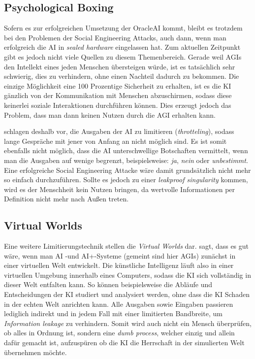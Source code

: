        \subsection{Psychological Boxing}

        Sofern es zur erfolgreichen Umsetzung der OracleAI kommt, bleibt es trotzdem bei den Problemen der Social
        Engineering Attacks, auch dann, wenn man erfolgreich die AI in \textit{sealed hardware} eingelassen hat.\cite[p. 4]{ebhardt2018threat}
        Zum aktuellen Zeitpunkt gibt es jedoch nicht viele Quellen zu diesem Themenbereich. Gerade weil AGIs den Intellekt
        eines jeden Menschen übersteigen würde, ist es tatsächlich sehr schwierig, dies zu verhindern, ohne einen Nachteil
        dadurch zu bekommen.\cite[p. 204]{yampolskiy2012leakproofing} Die einzige Möglichkeit eine 100 Prozentige Sicherheit
        zu erhalten, ist es die KI gänzlich von der Kommunikation mit Menschen abzuschirmen, sodass diese keinerlei
        soziale Interaktionen durchführen können. Dies erzeugt jedoch das Problem, dass man dann keinen Nutzen durch
        die AGI erhalten kann.

        \citealp{armstrongforthcoming} schlagen deshalb vor, die Ausgaben der AI zu limitieren (\textit{throtteling}), sodass
        lange Gespräche mit jener von Anfang an nicht möglich sind.\cite[p. 306]{armstrongforthcoming} Es ist somit
        ebenfalls nicht möglich, dass die AI unterschwellige Botschaften vermittelt, wenn man die Ausgaben auf wenige
        begrenzt, beispielsweise: \textit{ja}, \textit{nein} oder \textit{unbestimmt}. Eine erfolgreiche Social Engineering
        Attacke wäre damit grundsätzlich nicht mehr so einfach durchzuführen.\cite[p. 309]{armstrongforthcoming}
        Sollte es jedoch zu einer \textit{leakproof singularity} kommen, wird es der Menschheit kein Nutzen bringen, da
        wertvolle Informationen per Definition nicht mehr nach Außen treten.

        \subsection{Virtual Worlds}
        Eine weitere Limitierungstechnik stellen die \textit{Virtual Worlds} dar. \citep{chalmers2010singularity} sagt,
        dass es gut wäre, wenn man AI -und AI+-Systeme (gemeint sind hier AGIs) zunächst in einer virtuellen Welt
        entwickelt. \cite[p. 37]{chalmers2010singularity} Die künstliche Intelligenz läuft also in einer virtuellen Umgebung
        innerhalb eines Computers, sodass die KI sich vollständig in dieser Welt entfalten kann. So können beispielsweise
        die Abläufe und Entscheidungen der KI studiert und analysiert werden, ohne dass die KI Schaden in der echten Welt
        anrichten kann. Alle Ausgaben sowie Eingaben passieren lediglich indirekt und in jedem Fall mit einer limitierten
        Bandbreite, um \textit{Information leakage} zu verhindern. \cite[p. 310]{armstrongforthcoming} Somit wird auch
        nicht ein Mensch überprüfen, ob alles in Ordnung ist, sondern eine \textit{dumb process}, welcher einzig und allein
        dafür gemacht ist, aufzuspüren ob die KI die Herrschaft in der simulierten Welt übernehmen möchte.

